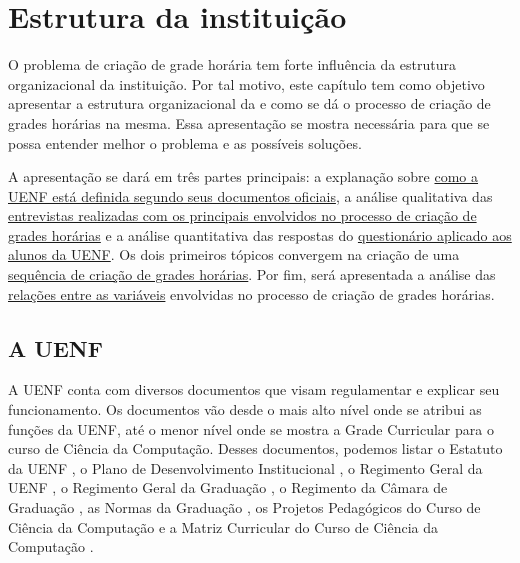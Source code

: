 \chapter{Estrutura da instituição} \label{chap:instituicao} %

O problema de criação de grade horária tem forte influência da estrutura organizacional da instituição. Por tal motivo, este capítulo tem como objetivo apresentar a estrutura organizacional da  e como se dá o processo de criação de grades horárias na mesma. Essa apresentação se mostra necessária para que se possa entender melhor o problema e as possíveis soluções.

A apresentação se dará em três partes principais: a explanação sobre \hyperref[sec:estatuto]{como a UENF está definida segundo seus documentos oficiais}, a análise qualitativa das \hyperref[sec:entrevistas]{entrevistas realizadas com os principais envolvidos no processo de criação de grades horárias} e a análise quantitativa das respostas do \hyperref[sec:formulario]{questionário aplicado aos alunos da UENF}. Os dois primeiros tópicos convergem na criação de uma \hyperref[sec:sequencia]{sequência de criação de grades horárias}. Por fim, será apresentada a análise das \hyperref[sec:relacoes]{relações entre as variáveis} envolvidas no processo de criação de grades horárias.


\section{A UENF} \label{sec:estatuto} %

A UENF conta com diversos documentos que visam regulamentar e explicar seu funcionamento. Os documentos vão desde o mais alto nível onde se atribui as funções da UENF, até o menor nível onde se mostra a Grade Curricular para o curso de Ciência da Computação. Desses documentos, podemos listar o Estatuto da UENF \cite{Estatuto2002}, o Plano de Desenvolvimento Institucional \cite{PDI2023}, o Regimento Geral da UENF \cite{RegimentoGeralUENF2006}, o Regimento Geral da Graduação \cite{RegimentoGeralGraduação2012}, o Regimento da Câmara de Graduação \cite{RegimentoCâmaraGraduação2012}, as Normas da Graduação \cite{Normas2012}, os Projetos Pedagógicos do Curso de Ciência da Computação \cite{PPCCC2005, PPCCC2015, PPCCC2022} e a Matriz Curricular do Curso de Ciência da Computação \cite{Matriz2015}.

